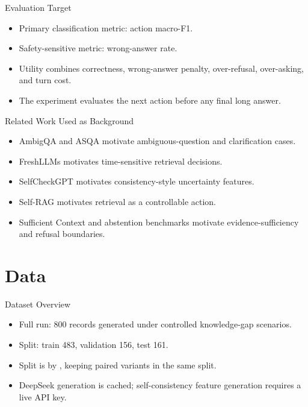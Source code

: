 \documentclass[aspectratio=169,10pt]{beamer}
\newcommand{\code}[1]{\texttt{\small\detokenize{#1}}}
\begin{document}
\begin{frame}{Evaluation Target}
  \begin{itemize}
    \item Primary classification metric: action macro-F1.
    \item Safety-sensitive metric: wrong-answer rate.
    \item Utility combines correctness, wrong-answer penalty, over-refusal, over-asking, and turn cost.
    \item The experiment evaluates the next action before any final long answer.
  \end{itemize}
\end{frame}

\begin{frame}{Related Work Used as Background}
  \begin{itemize}
    \item AmbigQA and ASQA motivate ambiguous-question and clarification cases.
    \item FreshLLMs motivates time-sensitive retrieval decisions.
    \item SelfCheckGPT motivates consistency-style uncertainty features.
    \item Self-RAG motivates retrieval as a controllable action.
    \item Sufficient Context and abstention benchmarks motivate evidence-sufficiency and refusal boundaries.
  \end{itemize}
\end{frame}

\section{Data}

\begin{frame}{Dataset Overview}
  \begin{itemize}
    \item Full run: 800 records generated under controlled knowledge-gap scenarios.
    \item Split: train 483, validation 156, test 161.
    \item Split is by \code{group_id}, keeping paired variants in the same split.
    \item DeepSeek generation is cached; self-consistency feature generation requires a live API key.
  \end{itemize}
\end{frame}
\end{document}
